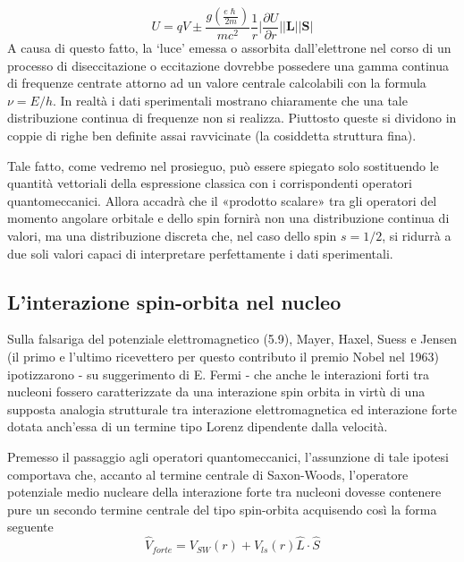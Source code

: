 \[
U = qV \pm \frac{g \left( \frac{e\hslash}{2m} \right)}{m c^{2}} \frac{1}{r} \bigg| \frac{ \partial U }{ \partial r }  \bigg| \bigg|\bm{L}  \bigg|  \bigg|\bm{S} \bigg|
\]
A causa di questo fatto, la ‘luce’ emessa o assorbita dall’elettrone nel corso di un processo di diseccitazione o eccitazione dovrebbe possedere una gamma continua di frequenze centrate attorno ad un valore centrale calcolabili con la formula $\nu = E / h$.
In realtà i dati sperimentali mostrano chiaramente che una tale distribuzione continua di frequenze non si realizza. Piuttosto queste si dividono in coppie di righe ben definite assai ravvicinate (la cosiddetta struttura fina).

Tale fatto, come vedremo nel prosieguo, può essere spiegato solo sostituendo le quantità vettoriali della espressione classica con i corrispondenti operatori quantomeccanici. Allora accadrà che il «prodotto scalare» tra gli operatori del momento angolare orbitale e dello spin fornirà non una distribuzione continua di valori, ma una distribuzione discreta che, nel caso dello spin $s=1/2$, si ridurrà a due soli valori capaci di interpretare perfettamente i dati sperimentali.

\subsection{L'interazione spin-orbita nel nucleo}\label{sec:spin-orbit-interaction-nucleus}

Sulla falsariga del potenziale elettromagnetico (5.9), Mayer, Haxel, Suess e Jensen (il primo e l’ultimo ricevettero per questo contributo il premio Nobel nel 1963) ipotizzarono - su suggerimento di E. Fermi - che anche le interazioni forti tra nucleoni fossero caratterizzate da una interazione spin orbita in virtù di una supposta analogia strutturale tra interazione elettromagnetica ed interazione forte dotata anch’essa di un termine tipo Lorenz dipendente dalla velocità.
\bigskip

Premesso il passaggio agli operatori quantomeccanici, l’assunzione di tale ipotesi comportava che, accanto al termine centrale di Saxon-Woods, l’operatore potenziale medio nucleare della interazione forte tra nucleoni dovesse contenere pure un secondo termine centrale del tipo spin-orbita acquisendo così la forma seguente
\begin{equation}
	\boxed{\hat{V}_{forte} = V_{SW}(r) + V_{ls}(r) \hat{L} \cdot  \hat{S}}
	\label{eq:mean-nuclear-potential-operator}
\end{equation}

